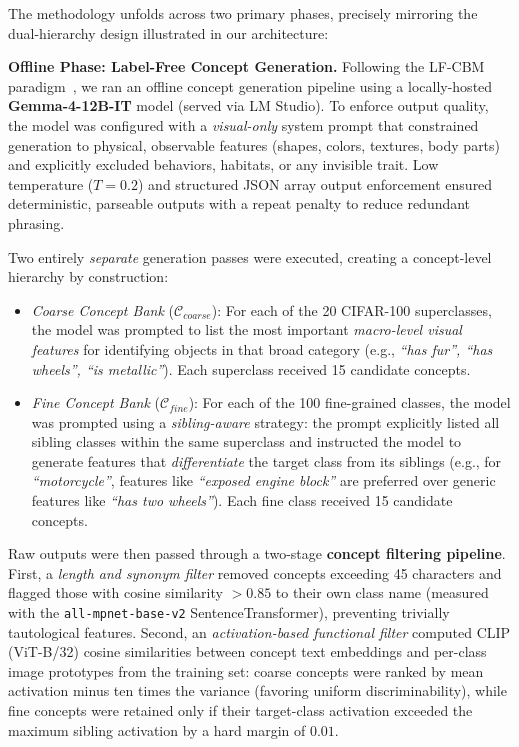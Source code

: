 \documentclass[sigconf, nonacm]{acmart}
\begin{document}
The methodology unfolds across two primary phases, precisely mirroring the dual-hierarchy design illustrated in our architecture:

\textbf{Offline Phase: Label-Free Concept Generation.} Following the LF-CBM paradigm~\cite{Pastor_2026_tutorial}, we ran an offline concept generation pipeline using a locally-hosted \textbf{Gemma-4-12B-IT} model (served via LM Studio). To enforce output quality, the model was configured with a \textit{visual-only} system prompt that constrained generation to physical, observable features (shapes, colors, textures, body parts) and explicitly excluded behaviors, habitats, or any invisible trait. Low temperature ($T{=}0.2$) and structured JSON array output enforcement ensured deterministic, parseable outputs with a repeat penalty to reduce redundant phrasing.

Two entirely \textit{separate} generation passes were executed, creating a concept-level hierarchy by construction:
\begin{itemize}
    \item \textit{Coarse Concept Bank} ($\mathcal{C}_{coarse}$): For each of the 20 CIFAR-100 superclasses, the model was prompted to list the most important \textit{macro-level visual features} for identifying objects in that broad category (e.g., \textit{``has fur'', ``has wheels'', ``is metallic''}). Each superclass received 15 candidate concepts.
    \item \textit{Fine Concept Bank} ($\mathcal{C}_{fine}$): For each of the 100 fine-grained classes, the model was prompted using a \textit{sibling-aware} strategy: the prompt explicitly listed all sibling classes within the same superclass and instructed the model to generate features that \textit{differentiate} the target class from its siblings (e.g., for \textit{``motorcycle''}, features like \textit{``exposed engine block''} are preferred over generic features like \textit{``has two wheels''}). Each fine class received 15 candidate concepts.
\end{itemize}

Raw outputs were then passed through a two-stage \textbf{concept filtering pipeline}. First, a \textit{length and synonym filter} removed concepts exceeding 45 characters and flagged those with cosine similarity $> 0.85$ to their own class name (measured with the \texttt{all-mpnet-base-v2} SentenceTransformer), preventing trivially tautological features. Second, an \textit{activation-based functional filter} computed CLIP (ViT-B/32) cosine similarities between concept text embeddings and per-class image prototypes from the training set: coarse concepts were ranked by mean activation minus ten times the variance (favoring uniform discriminability), while fine concepts were retained only if their target-class activation exceeded the maximum sibling activation by a hard margin of $0.01$.
\end{document}
